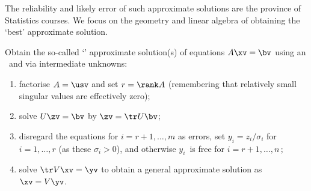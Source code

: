 The reliability and likely error of such approximate solutions are the province of Statistics courses.
We focus on the geometry and linear algebra of obtaining the `best' approximate solution.



\begin{procedure}\label{pro:appsol}
    Obtain the so-called `' approximate solution(s) of  equations $A\xv=\bv$ using an \svd\ and via intermediate unknowns:
    \begin{enumerate}
    \item \label{as:a0} factorise \(A=\usv\) and set \(r=\rank A\) (remembering that relatively small singular values are effectively zero);
        \item \label{as:a1} solve \(U\zv=\bv\) by $\zv=\tr U\bv$;
    
        \item \label{as:a2} disregard the equations for \(i=r+1,\ldots,m\) as errors, set $y_i=z_i/\sigma_i$ for $i=1,\ldots,r$  (as these $\sigma_i> 0$), and otherwise $y_i$~is free for $i=r+1,\ldots,n$\,; 
    
        \item \label{as:a4} solve \(\tr V\xv=\yv\) to obtain a general approximate solution as $\xv=V\yv$.
    \end{enumerate}
\end{procedure}




